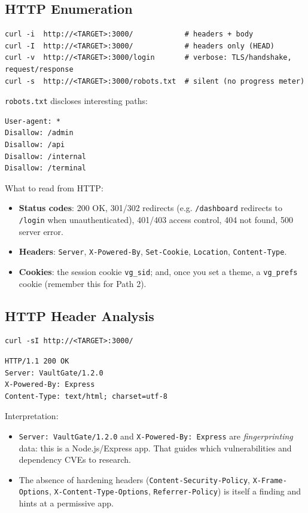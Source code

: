 \documentclass[11pt,a4paper]{article}
\begin{document}
\subsection{HTTP Enumeration}
\begin{lstlisting}[style=bash]
curl -i  http://<TARGET>:3000/            # headers + body
curl -I  http://<TARGET>:3000/            # headers only (HEAD)
curl -v  http://<TARGET>:3000/login       # verbose: TLS/handshake, request/response
curl -s  http://<TARGET>:3000/robots.txt  # silent (no progress meter)
\end{lstlisting}
\texttt{robots.txt} discloses interesting paths:
\begin{lstlisting}[style=plain]
User-agent: *
Disallow: /admin
Disallow: /api
Disallow: /internal
Disallow: /terminal
\end{lstlisting}
What to read from HTTP:
\begin{itemize}[leftmargin=1.4cm]
  \item \textbf{Status codes}: 200 OK, 301/302 redirects (e.g. \texttt{/dashboard}
  redirects to \texttt{/login} when unauthenticated), 401/403 access control,
  404 not found, 500 server error.
  \item \textbf{Headers}: \texttt{Server}, \texttt{X-Powered-By}, \texttt{Set-Cookie},
  \texttt{Location}, \texttt{Content-Type}.
  \item \textbf{Cookies}: the session cookie \texttt{vg\_sid}; and, once you set a
  theme, a \texttt{vg\_prefs} cookie (remember this for Path 2).
\end{itemize}

\subsection{HTTP Header Analysis}
\begin{lstlisting}[style=bash]
curl -sI http://<TARGET>:3000/
\end{lstlisting}
\begin{lstlisting}[style=plain]
HTTP/1.1 200 OK
Server: VaultGate/1.2.0
X-Powered-By: Express
Content-Type: text/html; charset=utf-8
\end{lstlisting}
Interpretation:
\begin{itemize}[leftmargin=1.4cm]
  \item \texttt{Server: VaultGate/1.2.0} and \texttt{X-Powered-By: Express} are
  \emph{fingerprinting} data: this is a Node.js/Express app. That guides which
  vulnerabilities and dependency CVEs to research.
  \item The absence of hardening headers (\texttt{Content-Security-Policy},
  \texttt{X-Frame-Options}, \texttt{X-Content-Type-Options},
  \texttt{Referrer-Policy}) is itself a finding and hints at a permissive app.
\end{itemize}
\end{document}
